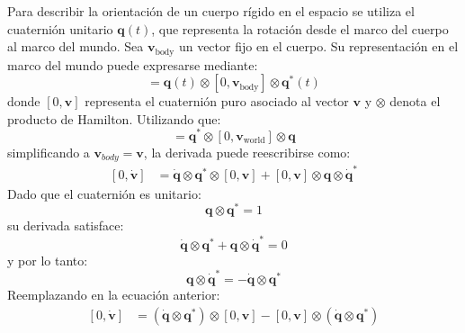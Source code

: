 Para describir la orientación de un cuerpo rígido en el espacio se utiliza el cuaternión unitario $\mathbf{q}(t)$, que representa la rotación desde el marco del cuerpo al marco del mundo. Sea $\mathbf{v}_{\text{body}}$ un vector fijo en el cuerpo. Su representación en el marco del mundo puede expresarse mediante:
%
\begin{equation}
    [0,\mathbf{v}_{\text{world}}]
    =
    \mathbf{q}(t)\otimes
    [0,\mathbf{v}_{\text{body}}]\otimes
    \mathbf{q}^*(t)
\end{equation}
%
donde $[0,\mathbf{v}]$ representa el cuaternión puro asociado al vector $\mathbf{v}$ y $\otimes$ denota el producto de Hamilton.
%
Utilizando que:
%
\begin{equation*}
    [0,\mathbf{v}_{body}]
    =
    \mathbf{q}^*\otimes
    [0,\mathbf{v}_{\text{world}}]\otimes
    \mathbf{q}
\end{equation*}
%
simplificando a $\mathbf{v}_{body}=\mathbf{v}$, la derivada puede reescribirse como:
%
\begin{equation*}
\begin{aligned}
    [0,\dot{\mathbf{v}}]
    &=
    \dot{\mathbf{q}}\otimes
    \mathbf{q}^*\otimes
    [0,\mathbf{v}]
    +
    [0,\mathbf{v}]\otimes
    \mathbf{q}\otimes
    \dot{\mathbf{q}}^*
\end{aligned}
\end{equation*}
%
Dado que el cuaternión es unitario:
%
\begin{equation*}
    \mathbf{q}\otimes\mathbf{q}^* = 1
\end{equation*}
%
su derivada satisface:
%
\begin{equation*}
    \dot{\mathbf{q}}\otimes
    \mathbf{q}^*
    +
    \mathbf{q}\otimes
    \dot{\mathbf{q}}^*
    =
    0
\end{equation*}
%
y por lo tanto:
%
\begin{equation*}
    \mathbf{q}\otimes
    \dot{\mathbf{q}}^*
    =
    -
    \dot{\mathbf{q}}\otimes
    \mathbf{q}^*
\end{equation*}
%
Reemplazando en la ecuación anterior:
%
\begin{equation*}
\begin{aligned}
    [0,\dot{\mathbf{v}}]
    &=
    \left(
        \dot{\mathbf{q}}\otimes
        \mathbf{q}^*
    \right)\otimes
    [0,\mathbf{v}]
    -
    [0,\mathbf{v}]\otimes
    \left(
        \dot{\mathbf{q}}\otimes
        \mathbf{q}^*
    \right)
\end{aligned}
\end{equation*}
